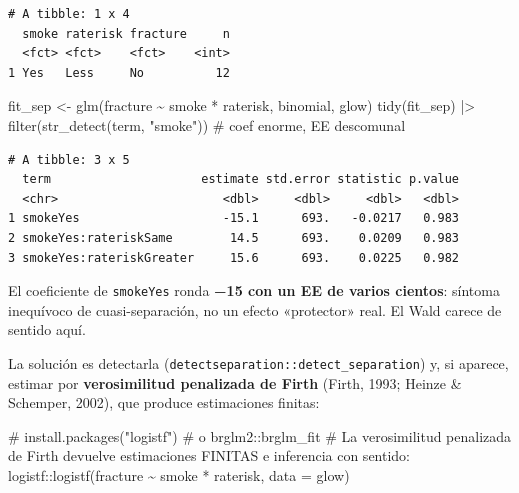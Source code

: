 \documentclass[
  letterpaper,
  DIV=11,
  numbers=noendperiod]{scrartcl}
\newenvironment{Shaded}{\begin{snugshade}}{\end{snugshade}}
\newcommand{\AttributeTok}[1]{\textcolor[rgb]{0.40,0.45,0.13}{#1}}
\newcommand{\CommentTok}[1]{\textcolor[rgb]{0.37,0.37,0.37}{#1}}
\newcommand{\FunctionTok}[1]{\textcolor[rgb]{0.28,0.35,0.67}{#1}}
\newcommand{\NormalTok}[1]{\textcolor[rgb]{0.00,0.23,0.31}{#1}}
\newcommand{\OtherTok}[1]{\textcolor[rgb]{0.00,0.23,0.31}{#1}}
\newcommand{\SpecialCharTok}[1]{\textcolor[rgb]{0.37,0.37,0.37}{#1}}
\newcommand{\StringTok}[1]{\textcolor[rgb]{0.13,0.47,0.30}{#1}}
\begin{document}
\begin{verbatim}
# A tibble: 1 x 4
  smoke raterisk fracture     n
  <fct> <fct>    <fct>    <int>
1 Yes   Less     No          12
\end{verbatim}

\begin{Shaded}
\begin{Highlighting}[]
\NormalTok{fit\_sep }\OtherTok{\textless{}{-}} \FunctionTok{glm}\NormalTok{(fracture }\SpecialCharTok{\textasciitilde{}}\NormalTok{ smoke }\SpecialCharTok{*}\NormalTok{ raterisk, binomial, glow)}
\FunctionTok{tidy}\NormalTok{(fit\_sep) }\SpecialCharTok{|\textgreater{}} \FunctionTok{filter}\NormalTok{(}\FunctionTok{str\_detect}\NormalTok{(term, }\StringTok{"smoke"}\NormalTok{))  }\CommentTok{\# coef enorme, EE descomunal}
\end{Highlighting}
\end{Shaded}

\begin{verbatim}
# A tibble: 3 x 5
  term                     estimate std.error statistic p.value
  <chr>                       <dbl>     <dbl>     <dbl>   <dbl>
1 smokeYes                    -15.1      693.   -0.0217   0.983
2 smokeYes:rateriskSame        14.5      693.    0.0209   0.983
3 smokeYes:rateriskGreater     15.6      693.    0.0225   0.982
\end{verbatim}

El coeficiente de \texttt{smokeYes} ronda \textbf{−15 con un EE de
varios cientos}: síntoma inequívoco de cuasi-separación, no un efecto
«protector» real. El Wald carece de sentido aquí.

La solución es detectarla
(\texttt{detectseparation::detect\_separation}) y, si aparece, estimar
por \textbf{verosimilitud penalizada de Firth} (Firth, 1993; Heinze \&
Schemper, 2002), que produce estimaciones finitas:

\begin{Shaded}
\begin{Highlighting}[]
\CommentTok{\# install.packages("logistf")  \# o brglm2::brglm\_fit}
\CommentTok{\# La verosimilitud penalizada de Firth devuelve estimaciones FINITAS e inferencia con sentido:}
\NormalTok{logistf}\SpecialCharTok{::}\FunctionTok{logistf}\NormalTok{(fracture }\SpecialCharTok{\textasciitilde{}}\NormalTok{ smoke }\SpecialCharTok{*}\NormalTok{ raterisk, }\AttributeTok{data =}\NormalTok{ glow)}
\end{Highlighting}
\end{Shaded}
\end{document}

